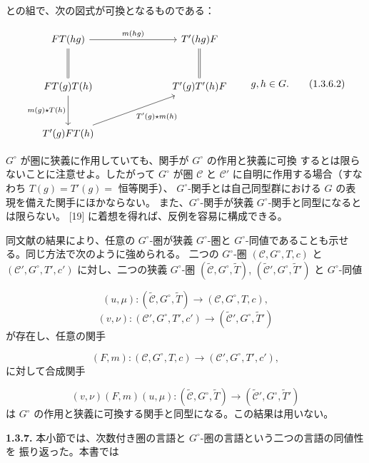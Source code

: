 \clearpage
{}%
との組で、次の図式が可換となるものである：

\begin{equation}
  \begin{tikzcd}[column sep=7em,row sep=3em]
    FT(hg) \arrow[r,"m(hg)"] \arrow[d,equal] &
      T'(hg)F \arrow[d,equal] \\
    FT(g)T(h) \arrow[d,"m(g)\mathbin{\star}T(h)"'] &
      T'(g)T'(h)F \\
    T'(g)FT(h) \arrow[ur,"T'(g)\mathbin{\star}m(h)"'] &
  \end{tikzcd}
  \qquad g,h\in G.
  \tag{1.3.6.2}
\end{equation}

$G^\circ$ が圏に狭義に作用していても、関手が $G^\circ$ の作用と狭義に可換
するとは限らないことに注意せよ。したがって $G^\circ$ が圏 $\mathcal C$ と
$\mathcal C'$ に自明に作用する場合（すなわち $T(g)=T'(g)=$ 恒等関手）、
$G^\circ$-関手とは自己同型群における $G$ の表現を備えた関手にほかならない。
また、$G^\circ$-関手が狭義 $G^\circ$-関手と同型になるとは限らない。
[19] に着想を得れば、反例を容易に構成できる。

同文献の結果により、任意の $G^\circ$-圏が狭義 $G^\circ$-圏と
$G^\circ$-同値であることも示せる。同じ方法で次のように強められる。
二つの $G^\circ$-圏 $(\mathcal C,G^\circ,T,c)$ と
$(\mathcal C',G^\circ,T',c')$ に対し、二つの狭義 $G^\circ$-圏
$(\widetilde{\mathcal C},G^\circ,\widetilde T)$,
$(\widetilde{\mathcal C}',G^\circ,\widetilde T')$ と $G^\circ$-同値

\[
  (u,\mu)\colon
  (\widetilde{\mathcal C},G^\circ,\widetilde T)
  \longrightarrow
  (\mathcal C,G^\circ,T,c),
\]
\[
  (v,\nu)\colon
  (\mathcal C',G^\circ,T',c')
  \longrightarrow
  (\widetilde{\mathcal C}',G^\circ,\widetilde T')
\]
が存在し、任意の関手

\[
  (F,m)\colon
  (\mathcal C,G^\circ,T,c)
  \longrightarrow
  (\mathcal C',G^\circ,T',c'),
\]
に対して合成関手

\[
  (v,\nu)(F,m)(u,\mu)\colon
  (\widetilde{\mathcal C},G^\circ,\widetilde T)
  \longrightarrow
  (\widetilde{\mathcal C}',G^\circ,\widetilde T')
\]
は $G^\circ$ の作用と狭義に可換する関手と同型になる。この結果は用いない。

\noindent\textbf{1.3.7.}\quad
本小節では、次数付き圏の言語と $G^\circ$-圏の言語という二つの言語の同値性を
振り返った。本書では
